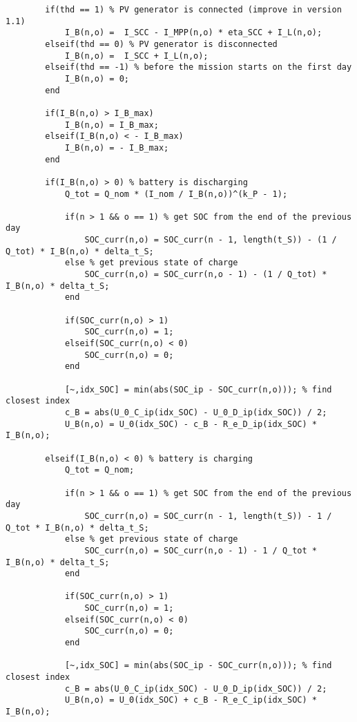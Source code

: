 \begin{lstlisting}
        if(thd == 1) % PV generator is connected (improve in version 1.1)
            I_B(n,o) =  I_SCC - I_MPP(n,o) * eta_SCC + I_L(n,o);
        elseif(thd == 0) % PV generator is disconnected
            I_B(n,o) =  I_SCC + I_L(n,o);
        elseif(thd == -1) % before the mission starts on the first day
            I_B(n,o) = 0;
        end
        
        if(I_B(n,o) > I_B_max)
            I_B(n,o) = I_B_max;
        elseif(I_B(n,o) < - I_B_max)
            I_B(n,o) = - I_B_max;
        end
        
        if(I_B(n,o) > 0) % battery is discharging 
            Q_tot = Q_nom * (I_nom / I_B(n,o))^(k_P - 1);
            
            if(n > 1 && o == 1) % get SOC from the end of the previous day
                SOC_curr(n,o) = SOC_curr(n - 1, length(t_S)) - (1 / Q_tot) * I_B(n,o) * delta_t_S;
            else % get previous state of charge
                SOC_curr(n,o) = SOC_curr(n,o - 1) - (1 / Q_tot) * I_B(n,o) * delta_t_S;
            end
            
            if(SOC_curr(n,o) > 1)
                SOC_curr(n,o) = 1;
            elseif(SOC_curr(n,o) < 0)
                SOC_curr(n,o) = 0;
            end
            
            [~,idx_SOC] = min(abs(SOC_ip - SOC_curr(n,o))); % find closest index
            c_B = abs(U_0_C_ip(idx_SOC) - U_0_D_ip(idx_SOC)) / 2;
            U_B(n,o) = U_0(idx_SOC) - c_B - R_e_D_ip(idx_SOC) * I_B(n,o);
            
        elseif(I_B(n,o) < 0) % battery is charging 
            Q_tot = Q_nom;
            
            if(n > 1 && o == 1) % get SOC from the end of the previous day
                SOC_curr(n,o) = SOC_curr(n - 1, length(t_S)) - 1 / Q_tot * I_B(n,o) * delta_t_S;
            else % get previous state of charge
                SOC_curr(n,o) = SOC_curr(n,o - 1) - 1 / Q_tot * I_B(n,o) * delta_t_S;
            end
            
            if(SOC_curr(n,o) > 1)
                SOC_curr(n,o) = 1;
            elseif(SOC_curr(n,o) < 0)
                SOC_curr(n,o) = 0;
            end
            
            [~,idx_SOC] = min(abs(SOC_ip - SOC_curr(n,o))); % find closest index
            c_B = abs(U_0_C_ip(idx_SOC) - U_0_D_ip(idx_SOC)) / 2;
            U_B(n,o) = U_0(idx_SOC) + c_B - R_e_C_ip(idx_SOC) * I_B(n,o);
            

\end{lstlisting}
